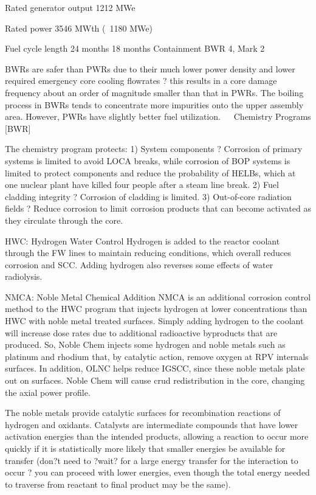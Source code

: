 \documentclass[10pt]{article}
\begin{document}
Rated generator output
1212 MWe

Rated power
3546 MWth (~1180 MWe)

Fuel cycle length
24 months
18 months
Containment
BWR 4, Mark 2


BWRs are safer than PWRs due to their much lower power density and lower required emergency core cooling flowrates ? this results in a core damage frequency about an order of magnitude smaller than that in PWRs. The boiling process in BWRs tends to concentrate more impurities onto the upper assembly area. However, PWRs have slightly better fuel utilization. 

Chemistry Programs [BWR]

The chemistry program protects:
1)	System components ? Corrosion of primary systems is limited to avoid LOCA breaks, while corrosion of BOP systems is limited to protect components and reduce the probability of HELBs, which at one nuclear plant have killed four people after a steam line break. 
2)	Fuel cladding integrity ? Corrosion of cladding is limited.
3)	Out-of-core radiation fields ? Reduce corrosion to limit corrosion products that can become activated as they circulate through the core.

HWC: Hydrogen Water Control
Hydrogen is added to the reactor coolant through the FW lines to maintain reducing conditions, which overall reduces corrosion and SCC. Adding hydrogen also reverses some effects of water radiolysis. 

NMCA: Noble Metal Chemical Addition
NMCA is an additional corrosion control method to the HWC program that injects hydrogen at lower concentrations than HWC with noble metal treated surfaces. Simply adding hydrogen to the coolant will increase dose rates due to additional radioactive byproducts that are produced. So, Noble Chem injects some hydrogen and noble metals such as platinum and rhodium that, by catalytic action, remove oxygen at RPV internals surfaces. In addition, OLNC helps reduce IGSCC, since these noble metals plate out on surfaces. Noble Chem will cause crud redistribution in the core, changing the axial power profile.

The noble metals provide catalytic surfaces for recombination reactions of hydrogen and oxidants. Catalysts are intermediate compounds that have lower activation energies than the intended products, allowing a reaction to occur more quickly if it is statistically more likely that smaller energies be available for transfer (don?t need to ?wait? for a large energy transfer for the interaction to occur ? you can proceed with lower energies, even though the total energy needed to traverse from reactant to final product may be the same). 
\end{document}
